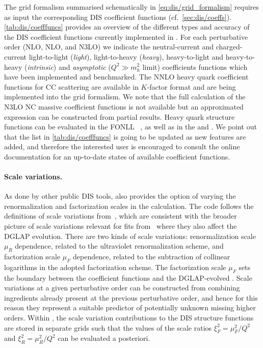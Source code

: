 The grid formalism summarised schematically in \cref{eq:dis/grid_formalism}
requires as input the corresponding DIS coefficient functions (cf.\
\cref{sec:dis/coeffs}).
%
\cref{tab:dis/coefffuncs} provides an overview of the different types and
accuracy of the DIS coefficient functions currently implemented in \yadism.
%
For each perturbative order (NLO, NLO, and N3LO) we indicate  the
neutral-current and charged-current light-to-light (\textit{light}),
light-to-heavy (\textit{heavy}), heavy-to-light and heavy-to-heavy
(\textit{intrinsic}) and \textit{asymptotic} ($Q^2 \gg m_h^2$ limit) 
coefficients functions which have been implemented and benchmarked.
%
The NNLO heavy quark coefficient functions for CC scattering are available in
$K$-factor format and are being implemented into the \yadism grid formalism.
%
We note that the full calculation of the N3LO NC massive coefficient functions
is not available but an approximated expression can be constructed from partial
results.
%
Heavy quark structure functions can be evaluated in the FONLL
\gmvfns~\cite{Forte:2010ta}, as well as in the \ffns and \zmvfns.
%
We point out that the list in \cref{tab:dis/coefffuncs} is going to be updated
as new features are added, and therefore the interested user is encouraged to
consult the online documentation for an up-to-date states of available
coefficient functions.

\paragraph{Scale variations.}
%
As done by other public DIS tools, \yadism also provides the option of varying
the renormalization and factorization scales in the calculation.
%
The code follows the definitions of scale variations
from~\cite{vanNeerven:2000uj,vanNeerven:2001pe}, which are consistent with the
broader picture of scale variations relevant for \pdf{} fits
from~\cite{NNPDF:2019ubu} where they also affect the DGLAP evolution.
%
There are two kinds of scale variations: renormalization scale $\mu_R$
dependence, related to the ultraviolet renormalization scheme, and
factorization scale $\mu_F$ dependence, related to the subtraction of collinear
logarithms in the adopted factorization scheme.
%
The factorization scale $\mu_F$ sets  the boundary between the coefficient
functions and the DGLAP-evolved \pdfs.
%
Scale variations at a given perturbative order can be constructed from
combining ingredients already present at the previous perturbative order, and
hence for this reason they represent a suitable predictor of potentially
unknown missing higher orders.
%
Within \yadism, the scale variation contributions to the DIS structure
functions are stored in separate grids such that the values of the scale ratios
$\xi_F^2=\mu_F^2/Q^2$ and $\xi_R^2=\mu_R^2/Q^2$ can be evaluated a posteriori.

